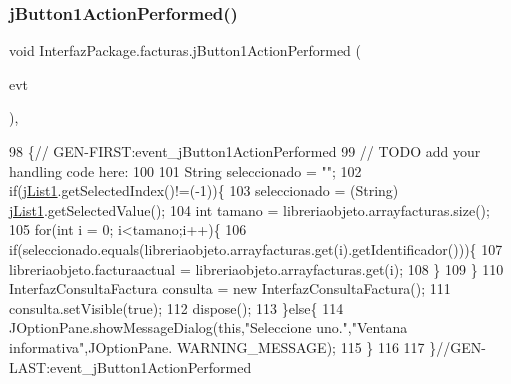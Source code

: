 \subsubsection{\texorpdfstring{j\+Button1\+Action\+Performed()}{jButton1ActionPerformed()}}
{\footnotesize\ttfamily void Interfaz\+Package.\+facturas.\+j\+Button1\+Action\+Performed (\begin{DoxyParamCaption}\item[{java.\+awt.\+event.\+Action\+Event}]{evt }\end{DoxyParamCaption})\hspace{0.3cm}{\ttfamily [inline]}, {\ttfamily [private]}}


\begin{DoxyCode}
98                                                                          \{\textcolor{comment}{//
      GEN-FIRST:event\_jButton1ActionPerformed}
99         \textcolor{comment}{// TODO add your handling code here:}
100         
101         String seleccionado = \textcolor{stringliteral}{""};
102         \textcolor{keywordflow}{if}(\mbox{\hyperlink{class_interfaz_package_1_1facturas_adbdef786d8dff4c1b59ff2a1308ed6c5}{jList1}}.getSelectedIndex()!=(-1))\{
103             seleccionado = (String) \mbox{\hyperlink{class_interfaz_package_1_1facturas_adbdef786d8dff4c1b59ff2a1308ed6c5}{jList1}}.getSelectedValue();
104             \textcolor{keywordtype}{int} tamano = libreriaobjeto.arrayfacturas.size();
105             \textcolor{keywordflow}{for}(\textcolor{keywordtype}{int} i = 0; i<tamano;i++)\{
106                  \textcolor{keywordflow}{if}(seleccionado.equals(libreriaobjeto.arrayfacturas.get(i).getIdentificador()))\{
107                        libreriaobjeto.facturaactual = libreriaobjeto.arrayfacturas.get(i);
108                  \}
109         \}
110             InterfazConsultaFactura consulta = \textcolor{keyword}{new} InterfazConsultaFactura();
111             consulta.setVisible(\textcolor{keyword}{true});
112             dispose();
113         \}\textcolor{keywordflow}{else}\{
114             JOptionPane.showMessageDialog(\textcolor{keyword}{this},\textcolor{stringliteral}{"Seleccione uno."},\textcolor{stringliteral}{"Ventana informativa"},JOptionPane.
      WARNING\_MESSAGE);
115         \}
116         
117     \}\textcolor{comment}{//GEN-LAST:event\_jButton1ActionPerformed}
\end{DoxyCode}
\mbox{\label{class_interfaz_package_1_1facturas_a023cec016c322f3d44297ce73f0e70e6}} 
